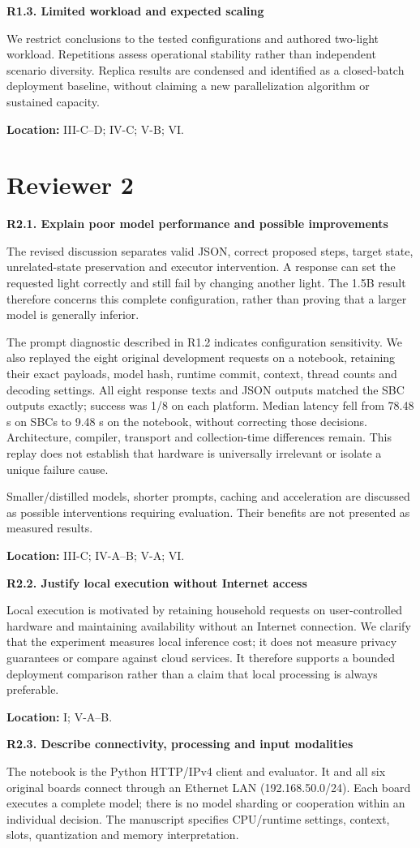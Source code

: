 \documentclass[11pt,a4paper]{article}
\newcommand{\point}[2]{\vspace{4pt}\textbf{#1. #2}\par}
\newcommand{\where}[1]{\par{\small\textcolor{ink}{\textbf{Location:} #1}}\par}
\begin{document}
\point{R1.3}{Limited workload and expected scaling}
We restrict conclusions to the tested configurations and authored two-light workload. Repetitions assess operational stability rather than independent scenario diversity. Replica results are condensed and identified as a closed-batch deployment baseline, without claiming a new parallelization algorithm or sustained capacity.
\where{III-C--D; IV-C; V-B; VI.}

\newpage
\section*{Reviewer 2}
\point{R2.1}{Explain poor model performance and possible improvements}
The revised discussion separates valid JSON, correct proposed steps, target state, unrelated-state preservation and executor intervention. A response can set the requested light correctly and still fail by changing another light. The 1.5B result therefore concerns this complete configuration, rather than proving that a larger model is generally inferior.

The prompt diagnostic described in R1.2 indicates configuration sensitivity. We also replayed the eight original development requests on a notebook, retaining their exact payloads, model hash, runtime commit, context, thread counts and decoding settings. All eight response texts and JSON outputs matched the SBC outputs exactly; success was 1/8 on each platform. Median latency fell from 78.48 s on SBCs to 9.48 s on the notebook, without correcting those decisions. Architecture, compiler, transport and collection-time differences remain. This replay does not establish that hardware is universally irrelevant or isolate a unique failure cause.

Smaller/distilled models, shorter prompts, caching and acceleration are discussed as possible interventions requiring evaluation. Their benefits are not presented as measured results.
\where{III-C; IV-A--B; V-A; VI.}

\point{R2.2}{Justify local execution without Internet access}
Local execution is motivated by retaining household requests on user-controlled hardware and maintaining availability without an Internet connection. We clarify that the experiment measures local inference cost; it does not measure privacy guarantees or compare against cloud services. It therefore supports a bounded deployment comparison rather than a claim that local processing is always preferable.
\where{I; V-A--B.}

\point{R2.3}{Describe connectivity, processing and input modalities}
The notebook is the Python HTTP/IPv4 client and evaluator. It and all six original boards connect through an Ethernet LAN (192.168.50.0/24). Each board executes a complete model; there is no model sharding or cooperation within an individual decision. The manuscript specifies CPU/runtime settings, context, slots, quantization and memory interpretation.
\end{document}
